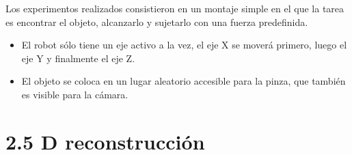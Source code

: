 Los experimentos realizados consistieron en un montaje simple en el que la tarea es encontrar el objeto, alcanzarlo y sujetarlo con una fuerza predefinida.


\begin{itemize}

\item El robot sólo tiene un eje activo a la vez, el eje X se moverá primero, luego el eje Y y finalmente el eje Z.
\item El objeto se coloca en un lugar aleatorio accesible para la pinza, que también es visible para la cámara.
\end{itemize}



\section{2.5 D reconstrucción}


